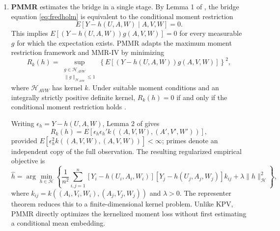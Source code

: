 \documentclass[11pt,twoside]{article}
\begin{document}
\begin{enumerate}
Theorem 1 of \cite{mastouri2021proximal} gives the
second-stage solution in operator form. Proposition 2 in the
March 2023 revision gives a finite kernel-matrix representation obtained by the representer theorem
and applies the Woodbury identity to replace a naive
$(m_1m_2)\times(m_1m_2)$ inversion, costing
$O((m_1m_2)^3)$, with an $m_2\times m_2$ solve costing
$O(m_2^3)$. This reduction concerns the second-stage solve;
the first-stage fit and construction of the kernel matrices
have additional computational costs.

\item \textbf{PMMR} estimates the bridge in a single stage.
By Lemma 1 of \cite{mastouri2021proximal}, the bridge equation
\eqref{eq:fredholm} is equivalent to the conditional moment
restriction
\[
    E[Y-h(U,A,W)\mid A,V,W]=0.
\]
This implies $E[(Y-h(U,A,W))g(A,V,W)]=0$ for every measurable
$g$ for which the expectation exists. PMMR adapts the maximum
moment restriction framework \cite{muandet2020kernel} and
MMR-IV \cite{zhang2020instrumental} by minimizing
\begin{equation}
\label{eq:pmmr_pop}
    R_k(h)
    =
    \sup_{\substack{g\in\mathcal H_{AVW}\\
                    \|g\|_{\mathcal H_{AVW}}\leq1}}
    \left\{E[(Y-h(U,A,W))g(A,V,W)]\right\}^{2},
\end{equation}
where $\mathcal H_{AVW}$ has kernel $k$.
Under suitable moment conditions and an integrally strictly
positive definite kernel, $R_k(h)=0$ if and only if the
conditional moment restriction holds
\cite{zhang2020instrumental,mastouri2021proximal}.

Writing $\epsilon_h=Y-h(U,A,W)$, Lemma 2 of
\cite{mastouri2021proximal} gives
\[
    R_k(h)
    =E\!\left[
        \epsilon_h\epsilon_h'
        k((A,V,W),(A',V',W'))
    \right],
\]
provided $E[\epsilon_h^2k((A,V,W),(A,V,W))]<\infty$;
primes denote an independent copy of the full observation.
The resulting regularized empirical objective is
\begin{equation}
\label{eq:pmmr_emp}
    \widehat h
    =\arg\min_{h\in\mathcal H}
    \left\{
        \frac{1}{n^2}\sum_{i,j=1}^n
        [Y_i-h(U_i,A_i,W_i)]
        [Y_j-h(U_j,A_j,W_j)]k_{ij}
        +\lambda\|h\|_{\mathcal H}^{2}
    \right\},
\end{equation}
where $k_{ij}=k((A_i,V_i,W_i),(A_j,V_j,W_j))$ and $\lambda>0$.
The representer theorem reduces this to a finite-dimensional
kernel problem. Unlike KPV, PMMR directly optimizes the
kernelized moment loss without first estimating a conditional
mean embedding.
\end{enumerate}
\end{document}
